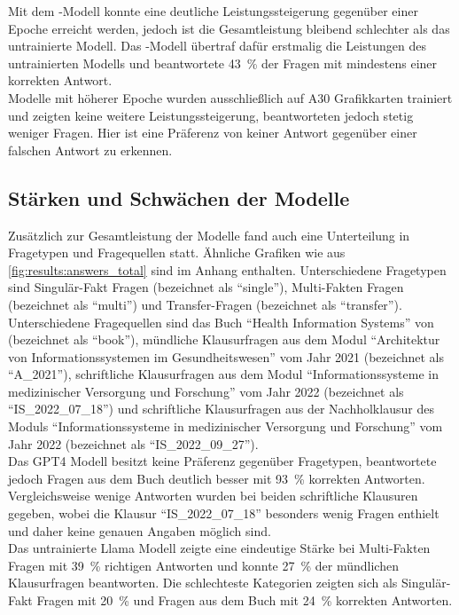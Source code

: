 Mit dem \lev-Modell konnte eine deutliche Leistungssteigerung gegenüber einer Epoche erreicht werden, jedoch ist die Gesamtleistung bleibend schlechter als das untrainierte Modell.
Das \lea-Modell übertraf dafür erstmalig die Leistungen des untrainierten Modells und beantwortete \SI{43}{\percent} der Fragen mit mindestens einer korrekten Antwort.\\

Modelle mit höherer Epoche wurden ausschließlich auf A30 Grafikkarten trainiert und zeigten keine weitere Leistungssteigerung, beantworteten jedoch stetig weniger Fragen.
Hier ist eine Präferenz von keiner Antwort gegenüber einer falschen Antwort zu erkennen.\\

\subsection{Stärken und Schwächen der Modelle}
Zusätzlich zur Gesamtleistung der Modelle fand auch eine Unterteilung in Fragetypen und Fragequellen statt.
Ähnliche Grafiken wie aus \cref{fig:results:answers_total} sind im Anhang enthalten.
Unterschiedene Fragetypen sind Singulär-Fakt Fragen (bezeichnet als \enquote{single}), Multi-Fakten Fragen (bezeichnet als \enquote{multi}) und Transfer-Fragen (bezeichnet als \enquote{transfer}).
Unterschiedene Fragequellen sind das Buch \enquote{Health Information Systems} von \citet{bb} (bezeichnet als \enquote{book}),
mündliche Klausurfragen aus dem Modul \enquote{Architektur von Informationssystemen im Gesundheitswesen} vom Jahr 2021 (bezeichnet als \enquote{A\_2021}),
schriftliche Klausurfragen aus dem Modul \enquote{Informationssysteme in medizinischer Versorgung und Forschung} vom Jahr 2022 (bezeichnet als \enquote{IS\_2022\_07\_18})
und schriftliche Klausurfragen aus der Nachholklausur des Moduls \enquote{Informationssysteme in medizinischer Versorgung und Forschung} vom Jahr 2022 (bezeichnet als \enquote{IS\_2022\_09\_27}).\\

Das GPT4 Modell besitzt keine Präferenz gegenüber Fragetypen, beantwortete jedoch Fragen aus dem Buch deutlich besser mit \SI{93}{\percent} korrekten Antworten.
Vergleichsweise wenige Antworten wurden bei beiden schriftliche Klausuren gegeben, wobei die Klausur \enquote{IS\_2022\_07\_18} besonders wenig Fragen enthielt und daher keine genauen Angaben möglich sind.\\

Das untrainierte Llama Modell zeigte eine eindeutige Stärke bei Multi-Fakten Fragen mit \SI{39}{\percent} richtigen Antworten und konnte \SI{27}{\percent} der mündlichen Klausurfragen beantworten.
Die schlechteste Kategorien zeigten sich als Singulär-Fakt Fragen mit \SI{20}{\percent} und Fragen aus dem Buch mit \SI{24}{\percent} korrekten Antworten.\\

